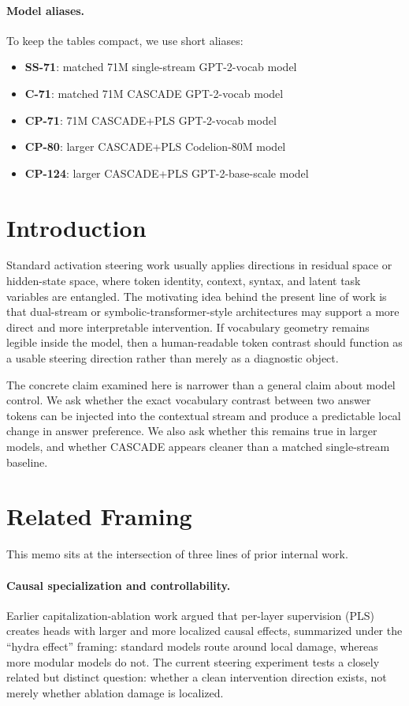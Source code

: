 \documentclass[11pt]{article}
\begin{document}
\paragraph{Model aliases.}
To keep the tables compact, we use short aliases:
\begin{itemize}[leftmargin=1.5em]
\item \textbf{SS-71}: matched 71M single-stream GPT-2-vocab model
\item \textbf{C-71}: matched 71M CASCADE GPT-2-vocab model
\item \textbf{CP-71}: 71M CASCADE+PLS GPT-2-vocab model
\item \textbf{CP-80}: larger CASCADE+PLS Codelion-80M model
\item \textbf{CP-124}: larger CASCADE+PLS GPT-2-base-scale model
\end{itemize}

\section{Introduction}

Standard activation steering work usually applies directions in residual space
or hidden-state space, where token identity, context, syntax, and latent task
variables are entangled. The motivating idea behind the present line of work is
that dual-stream or symbolic-transformer-style architectures may support a more
direct and more interpretable intervention. If vocabulary geometry remains
legible inside the model, then a human-readable token contrast should function
as a usable steering direction rather than merely as a diagnostic object.

The concrete claim examined here is narrower than a general claim about model
control. We ask whether the exact vocabulary contrast between two answer tokens
can be injected into the contextual stream and produce a predictable local
change in answer preference. We also ask whether this remains true in larger
models, and whether CASCADE appears cleaner than a matched single-stream
baseline.

\section{Related Framing}

This memo sits at the intersection of three lines of prior internal work.

\paragraph{Causal specialization and controllability.}
Earlier capitalization-ablation work argued that per-layer supervision (PLS)
creates heads with larger and more localized causal effects, summarized under
the ``hydra effect'' framing: standard models route around local damage,
whereas more modular models do not. The current steering experiment tests a
closely related but distinct question: whether a clean intervention direction
exists, not merely whether ablation damage is localized.
\end{document}
